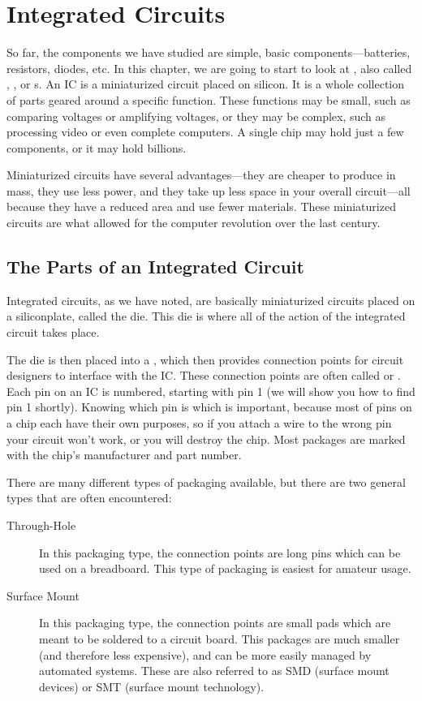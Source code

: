 \chapter{Integrated Circuits}
\label{chapIC}

So far, the components we have studied are simple, basic components---batteries, resistors, diodes, etc.
In this chapter, we are going to start to look at , also called , , or s.
An IC is a miniaturized circuit placed on silicon.
It is a whole collection of parts geared around a specific function.
These functions may be small, such as comparing voltages or amplifying voltages, or they may be complex, such as processing video or even complete computers.
A single chip may hold just a few components, or it may hold billions.

Miniaturized circuits have several advantages---they are cheaper to produce in mass, they use less power, and they take up less space in your overall circuit---all because they have a reduced area and use fewer materials.
These miniaturized circuits are what allowed for the computer revolution over the last century.

\section{The Parts of an Integrated Circuit}

Integrated circuits, as we have noted, are basically miniaturized circuits placed on a siliconplate, called the die.
This die is where all of the action of the integrated circuit takes place.

The die is then placed into a , which then provides connection points for circuit designers to interface with the IC.
These connection points are often called  or .
Each pin on an IC is numbered, starting with pin 1 (we will show you how to find pin 1 shortly).
Knowing which pin is which is important, because most of pins on a chip each have their own purposes, so if you attach a wire to the wrong pin your circuit won't work, or you will destroy the chip.
Most packages are marked with the chip's manufacturer and part number.

There are many different types of packaging available, but there are two general types that are often encountered:

\begin{description}
\item[Through-Hole] In this packaging type, the connection points are long pins which can be used on a breadboard.  This type of packaging is easiest for amateur usage.
\item[Surface Mount]  In this packaging type, the connection points are small pads which are meant to be soldered to a circuit board.  This packages are much smaller (and therefore less expensive), and can be more easily managed by automated systems.  These are also referred to as SMD (surface mount devices) or SMT (surface mount technology).
\end{description}

